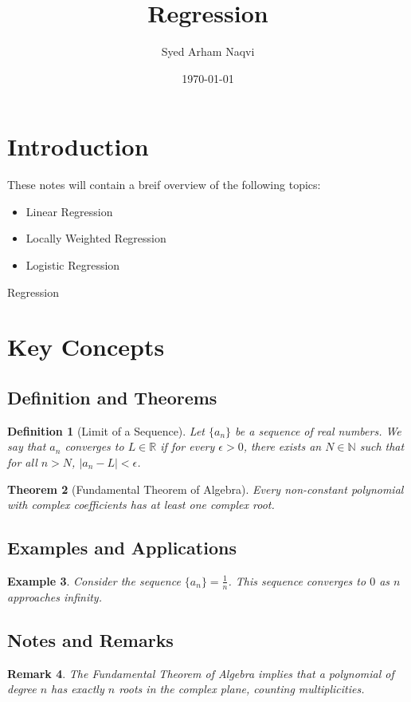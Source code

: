 \documentclass[11pt]{article}
\title{Regression}
\author{Syed Arham Naqvi}
\date{\today}
\newtheorem{theorem}{Theorem}[section]
\newtheorem{definition}[theorem]{Definition}
\newtheorem{example}[theorem]{Example}
\newtheorem{remark}[theorem]{Remark}
\newcommand{\R}{\mathbb{R}}
\newcommand{\N}{\mathbb{N}}
\begin{document}
\maketitle
\tableofcontents
\newpage

\section{Introduction}
These notes will contain a breif overview of the following topics:
\begin{itemize}
    \item Linear Regression
    \item Locally Weighted Regression
    \item Logistic Regression
\end{itemize}
Regression 

\newpage

\section{Key Concepts}

\subsection{Definition and Theorems}
\begin{definition}[Limit of a Sequence]
    Let $\{a_n\}$ be a sequence of real numbers. We say that $a_n$ converges to $L \in \R$ if for every $\epsilon > 0$, there exists an $N \in \N$ such that for all $n > N$, $|a_n - L| < \epsilon$.
\end{definition}

\begin{theorem}[Fundamental Theorem of Algebra]
    Every non-constant polynomial with complex coefficients has at least one complex root.
\end{theorem}

\subsection{Examples and Applications}
\begin{example}
    Consider the sequence $\{a_n\} = \frac{1}{n}$. This sequence converges to $0$ as $n$ approaches infinity.
\end{example}

\subsection{Notes and Remarks}
\begin{remark}
    The Fundamental Theorem of Algebra implies that a polynomial of degree $n$ has exactly $n$ roots in the complex plane, counting multiplicities.
\end{remark}
\end{document}
